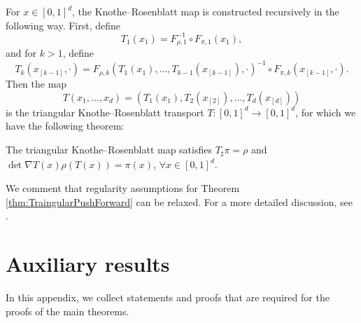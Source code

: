 For $x \in [0,1]^d$, the Knothe--Rosenblatt map is constructed recursively in the following way. First, define
$$T_1(x_1) = F_{\rho,1}^{-1}\circ F_{\pi,1}(x_1),$$
and for $k > 1$, define
\begin{equation}\label{eq:Tk}
  T_k(x_{[k-1]}, \cdot) = F_{\rho,k}(T_1(x_1),\dots ,T_{k-1}(x_{[k-1]}), \cdot)^{-1}\circ F_{\pi,k}(x_{[k-1]}, \cdot).
\end{equation}
Then the map $$T(x_1,\dots,x_d) =  \left ( T_1(x_1), T_2(x_{[2]}),\dots ,T_d(x_{[d]}) \right )$$
is the triangular Knothe--Rosenblatt transport $T:[0,1]^d\rightarrow[0,1]^d$, for which we have the following theorem:
\begin{theorem}\label{thm:TraingularPushForward}
The triangular Knothe--Rosenblatt map satisfies $T_\sharp\pi = \rho$ and  $\det\nabla T(x)\rho(T(x)) = \pi(x)$, $\forall x\in[0,1]^d$.
\end{theorem}
We comment that regularity assumptions for Theorem \ref{thm:TraingularPushForward} can be relaxed. For a more detailed discussion, see \cite{TrangularTransportofMeasure}. 
	




    
\section{%
  Auxiliary results
}\label{app:AuxResults}
In this appendix, we collect statements and proofs %
that are %
required for the proofs of the main theorems. %

